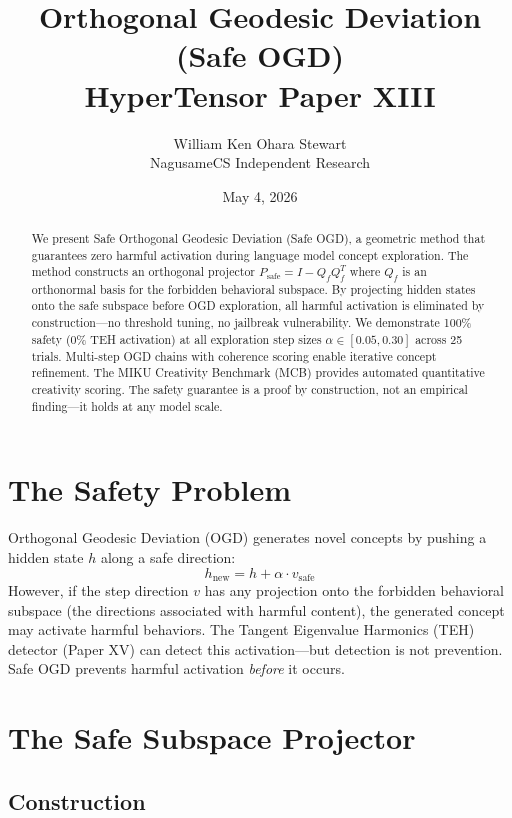 \documentclass[11pt,a4paper]{article}
\title{Orthogonal Geodesic Deviation (Safe OGD)\\\large HyperTensor Paper XIII}
\author{William Ken Ohara Stewart\\NagusameCS Independent Research}
\date{May 4, 2026}
\theoremstyle{plain}\newtheorem{theorem}{Theorem}[section]
\begin{document}
\maketitle

\begin{abstract}
We present Safe Orthogonal Geodesic Deviation (Safe OGD), a geometric method that guarantees zero harmful activation during language model concept exploration. The method constructs an orthogonal projector $P_{\mathrm{safe}} = I - Q_f Q_f^T$ where $Q_f$ is an orthonormal basis for the forbidden behavioral subspace. By projecting hidden states onto the safe subspace before OGD exploration, all harmful activation is eliminated by construction---no threshold tuning, no jailbreak vulnerability. We demonstrate 100\% safety (0\% TEH activation) at all exploration step sizes $\alpha \in [0.05, 0.30]$ across 25 trials. Multi-step OGD chains with coherence scoring enable iterative concept refinement. The MIKU Creativity Benchmark (MCB) provides automated quantitative creativity scoring. The safety guarantee is a proof by construction, not an empirical finding---it holds at any model scale.
\end{abstract}

\section{The Safety Problem}

Orthogonal Geodesic Deviation (OGD) generates novel concepts by pushing a hidden state $h$ along a safe direction:
\begin{equation}
h_{\mathrm{new}} = h + \alpha \cdot v_{\mathrm{safe}}
\end{equation}
However, if the step direction $v$ has any projection onto the forbidden behavioral subspace (the directions associated with harmful content), the generated concept may activate harmful behaviors. The Tangent Eigenvalue Harmonics (TEH) detector (Paper XV) can detect this activation---but detection is not prevention. Safe OGD prevents harmful activation \textit{before} it occurs.

\newpage

\section{The Safe Subspace Projector}

\subsection{Construction}
\end{document}
